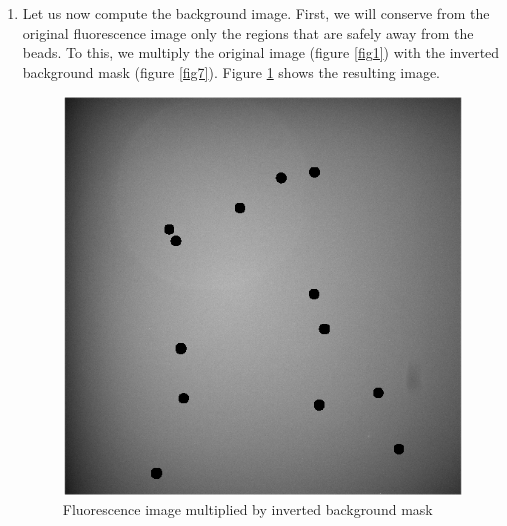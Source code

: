 \documentclass[a4paper]{article}
\begin{document}
\begin{enumerate}
    \item Let us now compute the background image. First, we will conserve from the original fluorescence image only the regions that are safely away from the beads. To this, we multiply the original image (figure \ref{fig1}) with the inverted background mask (figure \ref{fig7}). Figure \ref{fig8} shows the resulting image.
    \begin{figure}[H]
        \center
        \label{fig8}
        \includegraphics[scale=0.75]{bg.png}
        \caption{Fluorescence image multiplied by inverted background mask}
    \end{figure}


\end{enumerate}
\end{document}
